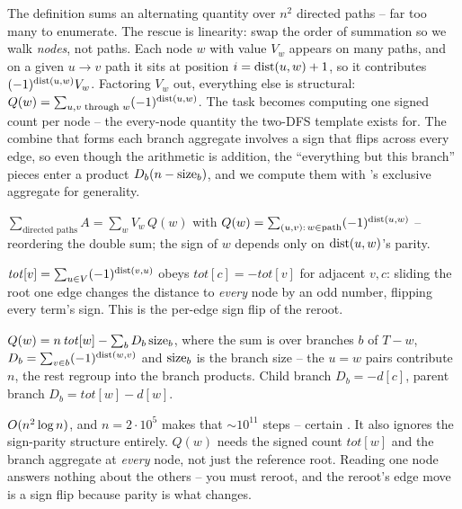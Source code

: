 The definition sums an alternating quantity over $n^2$ directed paths -- far too
many to enumerate. The rescue is linearity: swap the order of summation so we
walk \emph{nodes}, not paths. Each node $w$ with value $V_w$ appears on many
paths, and on a given $u\!\to\!v$ path it sits at position $i=\operatorname{dist}(u,w)+1$, so
it contributes $(-1)^{\operatorname{dist}(u,w)}V_w$. Factoring $V_w$ out, everything else is
structural: $Q(w) = \sum_{u,v \text{ through } w} (-1)^{\operatorname{dist}(u,w)}$. The task
becomes computing one signed count per node -- the every-node quantity the
two-DFS template exists for. The combine that forms each branch aggregate
involves a sign that flips across every edge, so even though the arithmetic is
addition, the ``everything but this branch'' pieces enter a product
$D_b(n-\operatorname{size}_b)$, and we compute them with 's exclusive
aggregate for generality.

\begin{observation}
$\sum_{\text{directed paths}} A = \sum_w V_w\,Q(w)$ with
$Q(w)=\sum_{(u,v):\,w\in\text{path}} (-1)^{\operatorname{dist}(u,w)}$ -- reordering the double
sum; the sign of $w$ depends only on $\operatorname{dist}(u,w)$'s parity.
\end{observation}
\begin{observation}
$\mathit{tot}[v]=\sum_{u\in V}(-1)^{\operatorname{dist}(v,u)}$ obeys $\mathit{tot}[c]=
-\mathit{tot}[v]$ for adjacent $v,c$: sliding the root one edge changes the
distance to \emph{every} node by an odd number, flipping every term's sign. This
is the per-edge sign flip of the reroot.
\end{observation}
\begin{observation}
$Q(w)=n\,\mathit{tot}[w]-\sum_b D_b\operatorname{size}_b$, where the sum is over branches $b$
of $T-w$, $D_b=\sum_{v\in b}(-1)^{\operatorname{dist}(w,v)}$ and $\operatorname{size}_b$ is the branch size
-- the $u=w$ pairs contribute $n$, the rest regroup into the branch products.
Child branch $D_b=-d[c]$, parent branch $D_b=\mathit{tot}[w]-d[w]$.
\end{observation}

\begin{thinkbox}
{$O(n^2 \log n)$, and $n=2\cdot10^5$ makes that $\sim10^{11}$ steps --
certain \tle. It also ignores the sign-parity structure entirely.}
{$Q(w)$ needs the signed count $\mathit{tot}[w]$ and the branch aggregate at
\emph{every} node, not just the reference root. Reading one node answers nothing
about the others -- you must reroot, and the reroot's edge move is a sign flip
because parity is what changes.}
\end{thinkbox}

